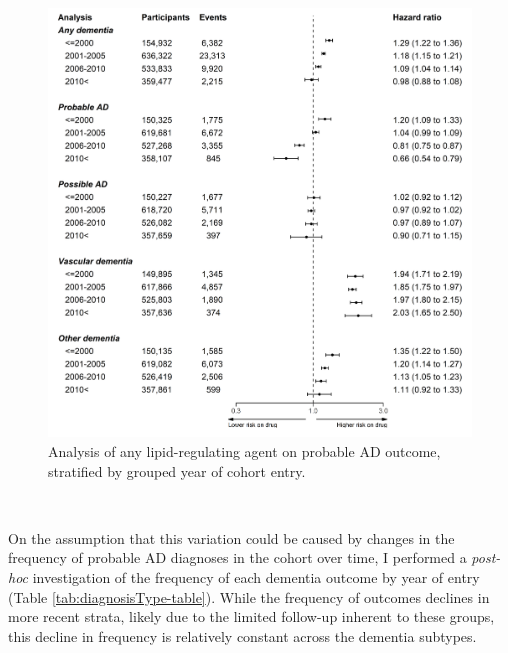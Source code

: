 \documentclass[a4paper, twoside]{templates/ociamthesis}
\begin{document}
\begin{figure}[H]
\includegraphics[width=1\linewidth]{figures/cprd-analysis/forester_cohort_entry} \caption[Sensitivity analysis: grouped year of entry]{Analysis of any lipid-regulating agent on probable AD outcome, stratified by grouped year of cohort entry.}\label{fig:diagnosisTypeFig}
\end{figure}

~

On the assumption that this variation could be caused by changes in the frequency of probable AD diagnoses in the cohort over time, I performed a \emph{post-hoc} investigation of the frequency of each dementia outcome by year of entry (Table \ref{tab:diagnosisType-table}). While the frequency of outcomes declines in more recent strata, likely due to the limited follow-up inherent to these groups, this decline in frequency is relatively constant across the dementia subtypes.

~
\end{document}
